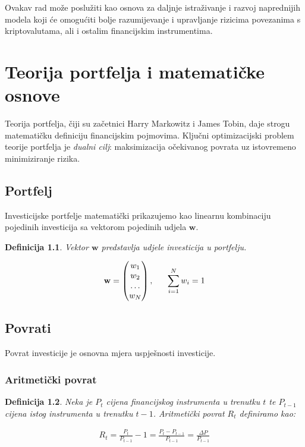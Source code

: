 \documentclass[zavrsnirad]{fer}
\newtheorem{definition}{Definicija}
\begin{document}
Ovakav rad može poslužiti kao osnova za daljnje istraživanje i razvoj
naprednijih modela koji će omogućiti bolje razumijevanje i upravljanje
rizicima povezanima s kriptovalutama, ali i ostalim financijskim instrumentima.
\chapter{Teorija portfelja i matematičke osnove}
\label{pog:teorija_portelja}
Teorija portfelja, čiji su začetnici Harry Markowitz i James Tobin,
daje strogu matematičku definiciju financijskim pojmovima.
Ključni optimizacijski problem teorije portfelja je
\textit{dualni cilj}: maksimizacija očekivanog povrata
uz istovremeno minimiziranje rizika.

\section{Portfelj}
\label{sek:portfelj}
Investicijske portfelje matematički prikazujemo kao linearnu kombinaciju
pojedinih investicija sa vektorom pojedinih udjela $\mathbf{w}$.
\begin{definition}
	Vektor $\mathbf{w}$ predstavlja udjele investicija u portfelju.
\end{definition}
\begin{align*}
	\mathbf{w} = \begin{pmatrix} w_1 \\ w_2 \\ \dots \\ w_N \end{pmatrix},
	\indent \sum_{i = 1}^{N} w_i = 1
\end{align*}

\section{Povrati}
\label{sek:povrati}
Povrat investicije je osnovna mjera uspješnosti investicije.
\subsection{Aritmetički povrat}

\begin{definition}
	Neka je $P_t$ cijena financijskog instrumenta u trenutku $t$ te
    $P_{t-1}$ cijena istog instrumenta u trenutku $t-1$. Aritmetički povrat
    $R_t$ definiramo kao:
\end{definition}
\begin{align*}R_t = \frac{P_t}{P_{t-1}} - 1 =
    \frac{P_t - P_{t-1}}{P_{t-1}} =
\frac{\Delta P}{P_{t-1}}
\end{align*}
\end{document}
